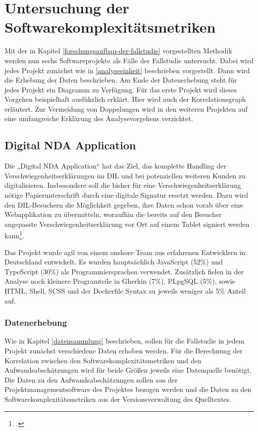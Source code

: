 \chapter{Untersuchung der Softwarekomplexitätsmetriken}\label{untersuchung-der-softwarekomplexituxe4tsmetriken}

Mit der in Kapitel \ref{forschungsaufbau-der-fallstudie} vorgestellten Methodik werden nun sechs
Softwareprojekte als Fälle der Fallstudie untersucht. Dabei wird jedes
Projekt zunächst wie in \ref{analyseeinheit} beschrieben vorgestellt. Dann wird die
Erhebung der Daten beschrieben. Am Ende der Datenerhebung steht für
jedes Projekt ein Diagramm zu Verfügung. Für das erste Projekt wird
dieses Vorgehen beispielhaft ausführlich erklärt. Hier wird auch der
Korrelationsgraph erläutert. Zur Vermeidung von Doppelungen wird in den
weiteren Projekten auf eine umfangreiche Erklärung des Analysevorgehens
verzichtet.

\section{Digital NDA Application}\label{digital-nda-application}

Die „Digital NDA Application`` hat das Ziel, das komplette Handling der
Verschwiegenheitserklärungen im DIL und bei potenziellen weiteren Kunden
zu digitalisieren. Insbesondere soll die bisher für eine
Verschwiegenheitserklärung nötige Papierunterschrift durch eine digitale
Signatur ersetzt werden. Dazu wird den DIL-Besuchern die Möglichkeit
gegeben, ihre Daten schon vorab über eine Webapplikation zu übermitteln,
woraufhin die bereits auf den Besucher angepasste
Verschwiegenheitserklärung vor Ort auf einem Tablet signiert werden
kann\footcite[Vgl. ][]{dxctechnologiesInternesDokumentAufbau2022}.

Das Projekt wurde agil von einem onshore Team aus erfahrenen Entwicklern
in Deutschland entwickelt. Es wurden hauptsächlich JavaScript
(52\%) und TypeScript (30\%)
als Programmiersprachen verwendet. Zusätzlich fielen in der Analyse noch
kleinere Programteile in Gherkin (7\%), PLpgSQL (5\%), sowie HTML,
Shell, SCSS und der Dockerfile Syntax zu jeweils weniger als 5\% Anteil
auf.

\subsection{Datenerhebung}\label{nda-Datenerhebung}

Wie in Kapitel \ref{datensammlung} beschrieben, sollen für die Fallstudie in jedem
Projekt zunächst verschiedene Daten erhoben werden. Für die Berechnung
der Korrelation zwischen den Softwarekomplexitätsmetriken und den
Aufwandsabschätzungen wird für beide Größen jeweils eine Datenquelle
benötigt. Die Daten zu den Aufwandsabschätzungen sollen aus der
Projektmanagementsoftware des Projektes bezogen werden und die Daten zu
den Softwarekomplexitätsmetriken aus der Versionsverwaltung des
Quelltextes.

